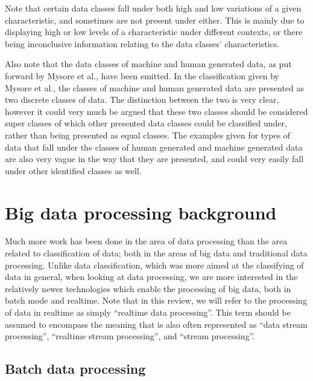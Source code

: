 \documentclass[a4paper,11pt]{article}
\begin{document}
Note that certain data classes fall under both high and low variations of a given characteristic, and sometimes are
not present under either. This is mainly due to displaying high or low levels of a characteristic under different
contexts, or there being inconclusive information relating to the data classes' characteristics.

Also note that the data classes of machine and human generated data, as put forward by Mysore et al.\cite{ibm_big_2013},
have been emitted. In the classification given by Mysore et al., the classes of machine and
human generated data are presented as two discrete classes of data. The distinction between the two is very clear,
however it could very much be argued that these two classes should be considered super classes of which other presented
data classes could be classified under, rather than being presented as equal classes. The examples given for types of
data that fall under the classes of human generated and
machine generated data are also very vague in the way that they are presented, and could very easily fall under other
identified classes as well.





\newpage

\section{Big data processing background} %
\label{sec:big_data_processing_background}

Much more work has been done in the area of data processing than the area related to classification of data; both in the
areas of big data and traditional data processing. Unlike data classification, which was more aimed at the classifying
of data in general, when looking at data processing, we are more interested in the relatively newer technologies which
enable the processing of big data, both in batch mode and realtime. Note that in this review, we will refer to the
processing of data in realtime as simply ``realtime data processing''. This term should be assumed to encompass the
meaning that is also often represented as ``data stream processing'', ``realtime stream processing'', and ``stream
processing''.

\subsection{Batch data processing} %
\label{sub:batch_data_processing}
\end{document}
